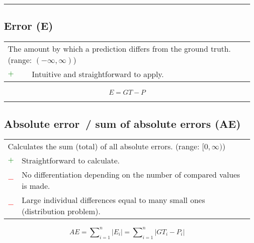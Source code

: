 \documentclass{article}
\begin{document}
\vspace{1cm}
\hrule




\clearpage




\subsection{Error (E)}

\begin{table}[H]\centering
	\begin{tabular}{m{}m{}}
		\multicolumn{2}{m{0.95\textwidth}}{The amount by which a prediction differs from the ground truth. (range: $(-\infty, \infty)$)} \\
		\textcolor{Green}{$+$} & Intuitive and straightforward to apply.
	\end{tabular}
\end{table}

\begin{equation}
	E = \textit{GT} - P
%
	\label{equation:E}
\end{equation}

\hrule


\subsection[Absolute error~/ sum of absolute errors (AE)]{Absolute error~/ sum of absolute errors (AE) \cite{richardson2004h}}

\begin{table}[H]\centering
	\begin{tabular}{m{}m{}}
		\multicolumn{2}{m{0.95\textwidth}}{Calculates the sum (total) of all absolute errors. (range: $[0, \infty)$)} \\
		\textcolor{Green}{$+$} & Straightforward to calculate. \\
		\textcolor{Red}{$-$}   & No differentiation depending on the number of compared values is made. \\
		\textcolor{Red}{$-$}   & Large individual differences equal to many small ones (distribution problem).
	\end{tabular}
\end{table}

\begin{equation}
	\textit{AE} = \sum\nolimits_{i = 1}^n |E_i| = \sum\nolimits_{i = 1}^n |\textit{GT}_i - P_i|
%
	\label{equation:AE}
\end{equation}
\end{document}
